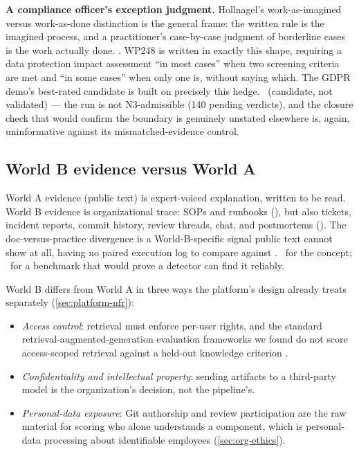 \textbf{A compliance officer's exception judgment.} Hollnagel's work-as-imagined versus
work-as-done distinction \parencite{hollnagel2018safety} is the general frame: the written rule is
the imagined process, and a practitioner's case-by-case judgment of borderline cases is the work
actually done. \evlit. WP248 is written in exactly this shape, requiring a data protection impact
assessment ``in most cases'' when two screening criteria are met and ``in some cases'' when only
one is, without saying which. The GDPR demo's best-rated candidate is built on precisely this
hedge. \evobs\ (candidate, not validated) --- the run is not N3-admissible (140 pending verdicts),
and the closure check that would confirm the boundary is genuinely unstated elsewhere is, again,
uninformative against its mismatched-evidence control.

\subsection{World B evidence versus World A}
\label{sec:org-worldb}

World A evidence (public text) is expert-voiced explanation, written to be read. World B evidence
is organizational trace: SOPs and runbooks (), but also tickets, incident reports,
commit history, review threads, chat, and postmortems (). The doc-versus-practice
divergence is a World-B-specific signal public text cannot show at all, having no paired execution
log to compare against \parencite{hollnagel2018safety}. \evlit\ for the concept; \evfut\ for a
benchmark that would prove a detector can find it reliably.

World B differs from World A in three ways the platform's design already treats separately
(\cref{sec:platform-nfr}):
\begin{itemize}[noitemsep]
  \item \emph{Access control}: retrieval must enforce per-user rights, and the standard
    retrieval-augmented-generation evaluation frameworks we found
    \parencite{gao2023retrieval,es2024ragas} do not score access-scoped retrieval against a
    held-out knowledge criterion \evhyp.
  \item \emph{Confidentiality and intellectual property}: sending artifacts to a third-party model
    is the organization's decision, not the pipeline's.
  \item \emph{Personal-data exposure}: Git authorship and review participation are the raw material
    for scoring who alone understands a component, which is personal-data processing about
    identifiable employees (\cref{sec:org-ethics}).
\end{itemize}

